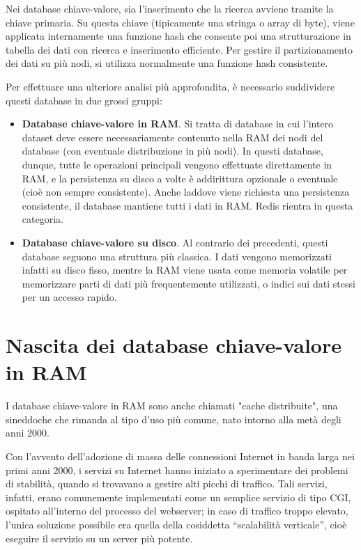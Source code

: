 Nei database chiave-valore, sia l'inserimento che la ricerca avviene tramite
la chiave primaria. Su questa chiave (tipicamente una stringa o array di byte),
viene applicata internamente una funzione hash che consente poi una strutturazione
in tabella dei dati con ricerca e inserimento efficiente. Per gestire il partizionamento
dei dati su più nodi, si utilizza normalmente una funzione hash consistente.

Per effettuare una ulteriore analisi più approfondita, è necessario suddividere
questi database in due grossi gruppi:

\begin{itemize}
	\medskip
	\item
	\textbf{Database chiave-valore in RAM}. Si tratta di database in cui l'intero dataset
	deve essere necessariamente contenuto nella RAM dei nodi del database
	(con eventuale distribuzione in più nodi). In questi database, dunque, tutte
	le operazioni principali vengono effettuate direttamente in RAM, e la persistenza
	su disco a volte è addirittura opzionale o eventuale (cioè non sempre consistente).
	Anche laddove viene richiesta una persistenza consistente, il database mantiene
	tutti i dati in RAM. Redis rientra in questa categoria.

	\item
	\textbf{Database chiave-valore su disco}. Al contrario dei precedenti, questi
	database seguono una struttura più classica. I dati vengono memorizzati infatti
	su disco fisso, mentre la RAM viene usata come memoria volatile per memorizzare
	parti di dati più frequentemente utilizzati, o indici sui dati stessi per un
	accesso rapido.
\end{itemize}

\section{Nascita dei database chiave-valore in RAM}
\label{sec:birth}

I database chiave-valore in RAM sono anche chiamati "cache distribuite", una sineddoche
che rimanda al tipo d'uso più comune, nato intorno alla metà degli anni 2000.

Con l'avvento dell'adozione di massa delle connessioni Internet in banda larga nei primi
anni 2000, i servizi su Internet hanno iniziato a sperimentare dei problemi di stabilità,
quando si trovavano a gestire alti picchi di traffico. Tali servizi, infatti, erano
comunemente implementati come un semplice servizio di tipo CGI, ospitato all'interno
del processo del webserver; in caso di traffico troppo elevato, l'unica soluzione possibile
era quella della cosiddetta ``scalabilità verticale'', cioè eseguire il servizio su un
server più potente.

